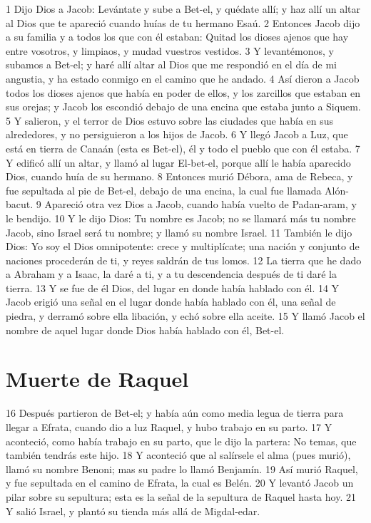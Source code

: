 1 Dijo Dios a Jacob: Levántate y sube a Bet-el, y quédate allí; y haz allí un altar al Dios que te apareció cuando huías de tu hermano Esaú.
2 Entonces Jacob dijo a su familia y a todos los que con él estaban: Quitad los dioses ajenos que hay entre vosotros, y limpiaos, y mudad vuestros vestidos.
3 Y levantémonos, y subamos a Bet-el; y haré allí altar al Dios que me respondió en el día de mi angustia, y ha estado conmigo en el camino que he andado.
4 Así dieron a Jacob todos los dioses ajenos que había en poder de ellos, y los zarcillos que estaban en sus orejas; y Jacob los escondió debajo de una encina que estaba junto a Siquem.
5 Y salieron, y el terror de Dios estuvo sobre las ciudades que había en sus alrededores, y no persiguieron a los hijos de Jacob.
6 Y llegó Jacob a Luz, que está en tierra de Canaán (esta es Bet-el), él y todo el pueblo que con él estaba.
7 Y edificó allí un altar, y llamó al lugar El-bet-el, porque allí le había aparecido Dios, cuando huía de su hermano.
8 Entonces murió Débora, ama de Rebeca, y fue sepultada al pie de Bet-el, debajo de una encina, la cual fue llamada Alón-bacut.
9 Apareció otra vez Dios a Jacob, cuando había vuelto de Padan-aram, y le bendijo.
10 Y le dijo Dios: Tu nombre es Jacob; no se llamará más tu nombre Jacob, sino Israel será tu nombre; y llamó su nombre Israel.
11 También le dijo Dios: Yo soy el Dios omnipotente: crece y multiplícate; una nación y conjunto de naciones procederán de ti, y reyes saldrán de tus lomos.
12 La tierra que he dado a Abraham y a Isaac, la daré a ti, y a tu descendencia después de ti daré la tierra.
13 Y se fue de él Dios, del lugar en donde había hablado con él.
14 Y Jacob erigió una señal en el lugar donde había hablado con él, una señal de piedra, y derramó sobre ella libación, y echó sobre ella aceite.
15 Y llamó Jacob el nombre de aquel lugar donde Dios había hablado con él, Bet-el.

\section{Muerte de Raquel}

16 Después partieron de Bet-el; y había aún como media legua de tierra para llegar a Efrata, cuando dio a luz Raquel, y hubo trabajo en su parto.
17 Y aconteció, como había trabajo en su parto, que le dijo la partera: No temas, que también tendrás este hijo.
18 Y aconteció que al salírsele el alma (pues murió), llamó su nombre Benoni; mas su padre lo llamó Benjamín.
19 Así murió Raquel, y fue sepultada en el camino de Efrata, la cual es Belén.
20 Y levantó Jacob un pilar sobre su sepultura; esta es la señal de la sepultura de Raquel hasta hoy.
21 Y salió Israel, y plantó su tienda más allá de Migdal-edar.

